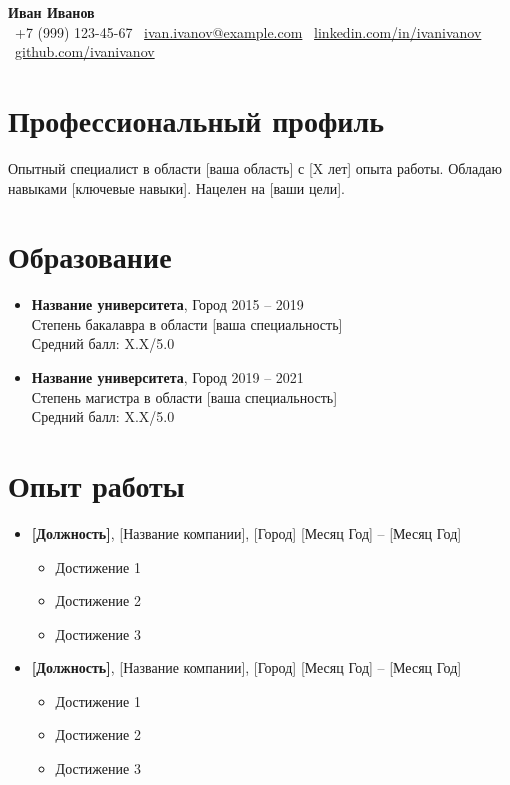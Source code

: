 \documentclass[a4paper,11pt]{article}
\begin{document}
\begin{center}
  {\Huge\textbf{Иван Иванов}}\\[0.3cm]
  \faPhone\ +7 (999) 123-45-67 \quad
  \faEnvelope\ \href{mailto:ivan.ivanov@example.com}{ivan.ivanov@example.com} \quad
  \faLinkedin\ \href{https://linkedin.com/in/ivanivanov}{linkedin.com/in/ivanivanov} \quad
  \faGithub\ \href{https://github.com/ivanivanov}{github.com/ivanivanov}
\end{center}

\section{Профессиональный профиль}
Опытный специалист в области [ваша область] с [X лет] опыта работы. Обладаю навыками [ключевые навыки]. Нацелен на [ваши цели].

\section{Образование}
\begin{itemize}[leftmargin=*]
  \item \textbf{Название университета}, Город \hfill 2015 -- 2019\\
  Степень бакалавра в области [ваша специальность]\\
  Средний балл: X.X/5.0

  \item \textbf{Название университета}, Город \hfill 2019 -- 2021\\
  Степень магистра в области [ваша специальность]\\
  Средний балл: X.X/5.0
\end{itemize}

\section{Опыт работы}
\begin{itemize}[leftmargin=*]
  \item \textbf{[Должность]}, [Название компании], [Город] \hfill [Месяц Год] -- [Месяц Год]
  \begin{itemize}
    \item Достижение 1
    \item Достижение 2
    \item Достижение 3
  \end{itemize}

  \item \textbf{[Должность]}, [Название компании], [Город] \hfill [Месяц Год] -- [Месяц Год]
  \begin{itemize}
    \item Достижение 1
    \item Достижение 2
    \item Достижение 3
  \end{itemize}
\end{itemize}
\end{document}
